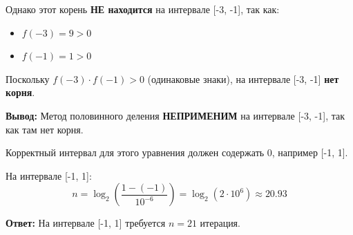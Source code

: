 \documentclass[a4paper,12pt]{article}
\begin{document}
Однако этот корень \textbf{НЕ находится} на интервале [-3, -1], так как:
\begin{itemize}
    \item $f(-3) = 9 > 0$
    \item $f(-1) = 1 > 0$
\end{itemize}

Поскольку $f(-3) \cdot f(-1) > 0$ (одинаковые знаки), на интервале [-3, -1] \textbf{нет корня}.

\textbf{Вывод:} Метод половинного деления \textbf{НЕПРИМЕНИМ} на интервале [-3, -1], так как там нет корня.

Корректный интервал для этого уравнения должен содержать 0, например [-1, 1].

На интервале [-1, 1]:
\[
    n = \log_2 \left( \frac{1 - (-1)}{10^{-6}} \right) = \log_2(2 \cdot 10^6) \approx 20.93
\]

\textbf{Ответ:} На интервале [-1, 1] требуется $n = 21$ итерация.
\end{document}
